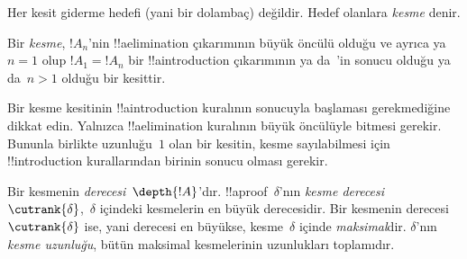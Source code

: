 \documentclass[../../../include/open-logic-section]{subfiles}
\begin{document}
Her kesit giderme hedefi (yani bir dolambaç) değildir. Hedef olanlara
\emph{kesme} denir.

\begin{defn}
Bir \emph{kesme}, $!A_n$'nin !!a{elimination} çıkarımının büyük öncülü
olduğu ve ayrıca ya $n=1$ olup $!A_1 = !A_n$ bir !!a{introduction}
çıkarımının ya da~\FalseInt'in sonucu olduğu ya da~$n>1$ olduğu bir
kesittir.
\end{defn}

Bir kesme kesitinin !!a{introduction} kuralının sonucuyla başlaması
gerekmediğine dikkat edin. Yalnızca !!a{elimination} kuralının büyük
öncülüyle bitmesi gerekir. Bununla birlikte uzunluğu~$1$ olan bir kesitin,
kesme sayılabilmesi için !!{introduction} kurallarından birinin sonucu
olması gerekir.

\begin{defn}
Bir kesmenin \emph{derecesi}~$\depth{!A}$'dır. !!a{proof}~$\delta$'nın
\emph{kesme derecesi}~$\cutrank{\delta}$,~$\delta$ içindeki kesmelerin en
büyük derecesidir. Bir kesmenin derecesi~$\cutrank{\delta}$ ise, yani
derecesi en büyükse, kesme~$\delta$ içinde \emph{maksimal}dir.
$\delta$'nın \emph{kesme uzunluğu}, bütün maksimal kesmelerinin
uzunlukları toplamıdır.
\end{defn}
\end{document}
